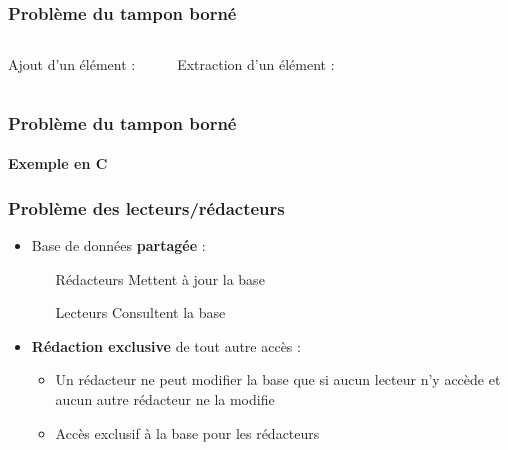 \begin{frame}
\frametitle{Problème du tampon borné}
\begin{columns}
Ajout d’un élément :
\begin{scriptsize}\end{scriptsize}
Extraction d’un élément :
\begin{scriptsize}\end{scriptsize}
\end{columns}
\end{frame}

\begin{frame}
\frametitle{Problème du tampon borné}
\framesubtitle{Exemple en C}
\begin{multicols}{2}
\begin{scriptsize}\end{scriptsize}
\end{multicols}
\end{frame}


\begin{frame}
\frametitle{Problème des lecteurs/rédacteurs}
\begin{itemize}
\item Base de données \textbf{partagée} :
\begin{itemize}
\item [Rédacteurs] Mettent à jour la base
\item [Lecteurs] Consultent la base
\end{itemize}
\item \textbf{Rédaction exclusive} de tout autre accès :
\begin{itemize}
\item Un rédacteur ne peut modifier la base que si aucun lecteur n’y accède et aucun autre rédacteur ne la modifie
\item Accès exclusif à la base pour les rédacteurs
\end{itemize}
\end{itemize}
\end{frame}

